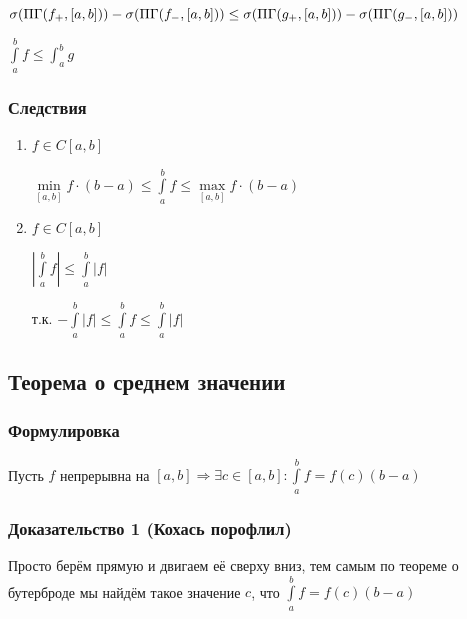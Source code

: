 \documentclass{article}
\begin{document}
                $\sigma (\Pi\Gamma(f_+, [a, b])) - \sigma (\Pi\Gamma(f_-, [a, b])) \leq \sigma (\Pi\Gamma(g_+, [a, b])) - \sigma (\Pi\Gamma(g_-, [a, b]))$
			
                $\int\limits^b_a f \leq \int^b_a g$
			
			\subsubsection{Следствия}
			
                \begin{enumerate}
                
                    \item $f \in C[a, b]$
                    
                        $\min\limits_{[a, b]} f \cdot (b - a) \leq \int\limits^b_a f \leq \max\limits_{[a, b]} f \cdot (b - a)$
                        
                    \item $f \in C[a, b]$
                    
                        $\left| \int\limits^b_a f \right| \leq \int\limits^b_a \left| f \right|$
                        
                        т.к. $- \int\limits^b_a \left| f \right| \leq \int\limits^b_a f \leq \int\limits^b_a \left| f \right|$
                        
                \end{enumerate}
                
		\subsection{Теорема о среднем значении}
		
			\subsubsection{Формулировка}
			
                Пусть $f$ непрерывна на $[a, b] \Rightarrow \exists c \in [a, b]: \int\limits^b_a f = f(c)(b-a)$
		
            \subsubsection{Доказательство 1 (Кохась порофлил)}
		
                Просто берём прямую и двигаем её сверху вниз, тем самым по теореме о бутерброде мы найдём такое значение $c$, что $\int\limits^b_a f = f(c)(b - a)$
			
\end{document}

